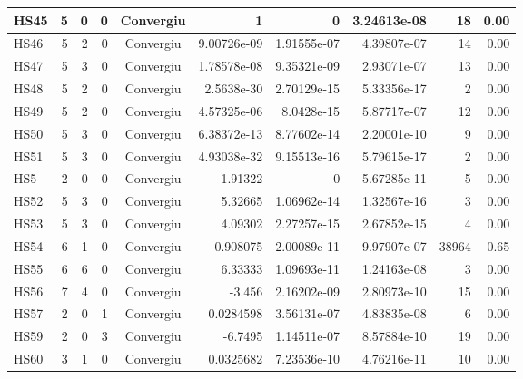 \begin{center}
\begin{longtable}{|l|r|r|r|c|r|r|r|r|r|}
    HS45 &      5 &      0 &      0 & Convergiu  &           1 &              0 & 3.24613e-08 &     18 &    0.00 \\ \hline
    HS46 &      5 &      2 &      0 & Convergiu  & 9.00726e-09 &    1.91555e-07 & 4.39807e-07 &     14 &    0.00 \\ \hline
    HS47 &      5 &      3 &      0 & Convergiu  & 1.78578e-08 &    9.35321e-09 & 2.93071e-07 &     13 &    0.00 \\ \hline
    HS48 &      5 &      2 &      0 & Convergiu  &  2.5638e-30 &    2.70129e-15 & 5.33356e-17 &      2 &    0.00 \\ \hline
    HS49 &      5 &      2 &      0 & Convergiu  & 4.57325e-06 &     8.0428e-15 & 5.87717e-07 &     12 &    0.00 \\ \hline
    HS50 &      5 &      3 &      0 & Convergiu  & 6.38372e-13 &    8.77602e-14 & 2.20001e-10 &      9 &    0.00 \\ \hline
    HS51 &      5 &      3 &      0 & Convergiu  & 4.93038e-32 &    9.15513e-16 & 5.79615e-17 &      2 &    0.00 \\ \hline
     HS5 &      2 &      0 &      0 & Convergiu  &    -1.91322 &              0 & 5.67285e-11 &      5 &    0.00 \\ \hline
    HS52 &      5 &      3 &      0 & Convergiu  &     5.32665 &    1.06962e-14 & 1.32567e-16 &      3 &    0.00 \\ \hline
    HS53 &      5 &      3 &      0 & Convergiu  &     4.09302 &    2.27257e-15 & 2.67852e-15 &      4 &    0.00 \\ \hline
    HS54 &      6 &      1 &      0 & Convergiu  &   -0.908075 &    2.00089e-11 & 9.97907e-07 &  38964 &    0.65 \\ \hline
    HS55 &      6 &      6 &      0 & Convergiu  &     6.33333 &    1.09693e-11 & 1.24163e-08 &      3 &    0.00 \\ \hline
    HS56 &      7 &      4 &      0 & Convergiu  &      -3.456 &    2.16202e-09 & 2.80973e-10 &     15 &    0.00 \\ \hline
    HS57 &      2 &      0 &      1 & Convergiu  &   0.0284598 &    3.56131e-07 & 4.83835e-08 &      6 &    0.00 \\ \hline
    HS59 &      2 &      0 &      3 & Convergiu  &     -6.7495 &    1.14511e-07 & 8.57884e-10 &     19 &    0.00 \\ \hline
    HS60 &      3 &      1 &      0 & Convergiu  &   0.0325682 &    7.23536e-10 & 4.76216e-11 &     10 &    0.00 \\ \hline

\end{longtable}
\end{center}
